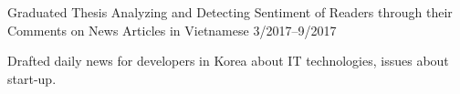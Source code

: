

\begin{cventries}

  \cventry
    {Graduated Thesis} %
    {Analyzing and Detecting Sentiment of Readers through their Comments on News Articles in Vietnamese} %
    {} %
    {3/2017--9/2017} %
    {
      \begin{cvitems} %
        \item {Drafted daily news for developers in Korea about IT technologies, issues about start-up.}
      \end{cvitems}
    }

\end{cventries}

